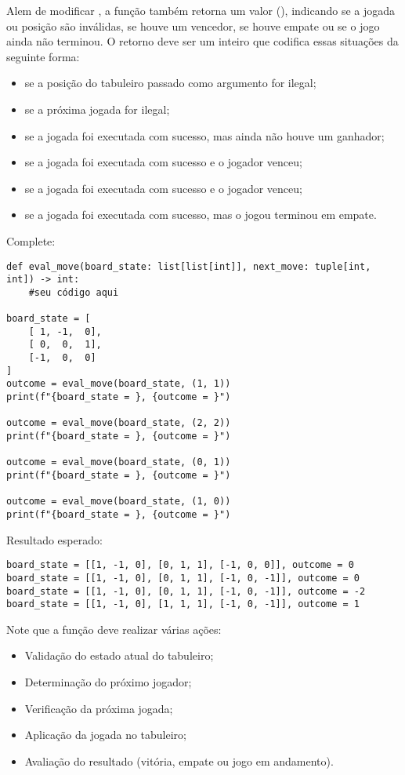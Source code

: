 Alem de modificar , a função também retorna um valor  (), indicando se a
jogada ou posição são inválidas, se houve um vencedor, se houve empate ou se o jogo ainda não terminou.
O retorno  deve ser um inteiro que codifica essas situações da seguinte forma:
\begin{itemize}
\item {} se a posição do tabuleiro passado como argumento for ilegal;
\item {} se a próxima jogada for ilegal;
\item {} se a jogada foi executada com sucesso, mas ainda não houve um ganhador;
\item {} se a jogada foi executada com sucesso e o jogador \px venceu;
\item {} se a jogada foi executada com sucesso e o jogador \po venceu;
\item {} se a jogada foi executada com sucesso, mas o jogou terminou em empate.
\end{itemize}

Complete:
\begin{verbatim}
def eval_move(board_state: list[list[int]], next_move: tuple[int, int]) -> int:
    #seu código aqui

board_state = [
    [ 1, -1,  0],
    [ 0,  0,  1],
    [-1,  0,  0]
]
outcome = eval_move(board_state, (1, 1))
print(f"{board_state = }, {outcome = }")

outcome = eval_move(board_state, (2, 2))
print(f"{board_state = }, {outcome = }")

outcome = eval_move(board_state, (0, 1))
print(f"{board_state = }, {outcome = }")

outcome = eval_move(board_state, (1, 0))
print(f"{board_state = }, {outcome = }")
\end{verbatim}

Resultado esperado:
\begin{verbatim}
board_state = [[1, -1, 0], [0, 1, 1], [-1, 0, 0]], outcome = 0
board_state = [[1, -1, 0], [0, 1, 1], [-1, 0, -1]], outcome = 0
board_state = [[1, -1, 0], [0, 1, 1], [-1, 0, -1]], outcome = -2
board_state = [[1, -1, 0], [1, 1, 1], [-1, 0, -1]], outcome = 1
\end{verbatim}

Note que a função deve realizar várias ações:
\begin{itemize}
\item Validação do estado atual do tabuleiro;
\item Determinação do próximo jogador;
\item Verificação da próxima jogada;
\item Aplicação da jogada no tabuleiro;
\item Avaliação do resultado (vitória, empate ou jogo em andamento).
\end{itemize}

